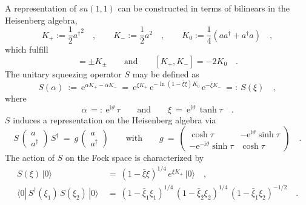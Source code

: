 \documentclass[a4paper,11pt]{article}
\numberwithin{equation}{section}
\def\a{\alpha}
\def\e{\mbox{e}}
\def\i{\mbox{i}}
\def\sfrac#1#2{{\textstyle\frac{#1}{#2}}}
\newcommand{\adag}{a^{\dagger}}
\begin{document}
A representation of $su(1,1)$ can be constructed in terms of
bilinears in the Heisenberg algebra,
\begin{equation}
K_+:=\sfrac12 {\adag}^2 \quad,\qquad
K_-:=\sfrac12 a^2 \quad,\qquad
K_0:=\sfrac14 (a\adag + \adag a) \quad,
\end{equation}
which fulfill
\begin{equation}
[K_0,K_\pm] = \pm K_\pm \qquad\textrm{and}\qquad
[K_+,K_-] = -2 K_0 \quad.
\end{equation}
The unitary squeezing operator $S$ may be defined as
\begin{equation}
S(\a)\ :=\ \e^{\a K_+ - \bar\a K_-} \ =\
\e^{\xi K_+}\,\e^{-\ln(1-\bar\xi\xi) K_0}\,\e^{-\bar\xi K_-}\
=:\ S(\xi) \quad,
\end{equation}
where
\begin{equation}
\a\ =:\ \e^{\i\vartheta}\,\tau \qquad\textrm{and}\qquad
\xi\ =\ \e^{\i\vartheta}\,\tanh\tau \quad.
\end{equation}
$S$ induces a representation on the Heisenberg algebra via
\begin{equation}
S\,\begin{pmatrix} a \\ \adag \end{pmatrix}\,S^\dagger\ =\
g\,\begin{pmatrix} a \\ \adag \end{pmatrix}
\qquad\textrm{with}\qquad
g\ =\ \begin{pmatrix}
\cosh\tau & -\e^{\i\vartheta}\sinh\tau \\[4pt]
-\e^{-\i\vartheta}\sinh\tau & \cosh\tau \end{pmatrix} \quad.
\end{equation}
The action of $S$ on the Fock space is characterized by
\begin{align} \nonumber
S(\xi)\,|0\rangle\ &=\ (1-\bar\xi\xi)^{1/4}\,e^{\xi K_+}\,|0\rangle \quad,\\
\langle0|\,S^\dagger(\xi_1)\,S(\xi_2)\,|0\rangle \ &=\
(1-\bar\xi_1\xi_1)^{1/4}\,(1-\bar\xi_2\xi_2)^{1/4}\,(1-\bar\xi_1\xi_2)^{-1/2}
\quad.
\end{align}
\end{document}
